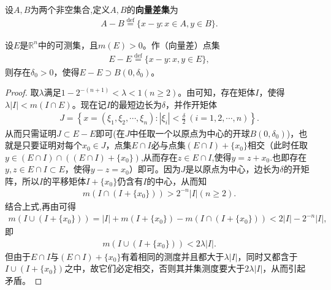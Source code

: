 \documentclass[../../main.tex]{subfiles}
\begin{document}
\begin{definition}[向量差集]\label{definition:向量差集}
设$A,B$为两个非空集合,定义$A,B$的\textbf{向量差集}为
\begin{align*}
A - B \stackrel{\text{def}}{=} \{x - y: x\in A,y \in B\}.
\end{align*}
\end{definition}

\begin{theorem}[Steinhaus定理]\label{theorem:Steinhaus定理}
设\(E\)是\(\mathbb{R}^n\)中的可测集，且\(m(E)>0\)。作（向量差）点集
\begin{align*}
E - E \stackrel{\text{def}}{=} \{x - y: x,y \in E\},
\end{align*}
则存在\(\delta_0>0\)，使得\(E - E \supset B(0,\delta_0)\)。
\end{theorem}
\begin{proof}
取\(\lambda\)满足\(1 - 2^{-(n + 1)}<\lambda<1\)$(n\geq 2)$。由可知，存在矩体\(I\)，使得\(\lambda|I|<m(I\cap E)\)。现在记\(I\)的最短边长为\(\delta\)，并作开矩体
\begin{align*}
J = \left\{x = (\xi_1,\xi_2,\cdots,\xi_n): |\xi_i|<\frac{\delta}{2}\ (i = 1,2,\cdots,n)\right\}.
\end{align*}
从而只需证明\(J\subset E - E\)即可(在$J$中任取一个以原点为中心的开球$B(0,\delta_0)$)，也就是只要证明对每个\(x_0\in J\)，点集\(E\cap I\)必与点集\((E\cap I)+\{x_0\}\)相交（此时任取$y\in (E\cap I)\cap((E\cap I)+\{x_0\})$,从而存在$z\in E\cap I$,使得$y=z+x_0$.也即存在\(y,z\in E\cap I\subset E\)，使得\(y - z = x_0\)）即可。因为\(J\)是以原点为中心，边长为\(\delta\)的开矩阵，所以\(I\)的平移矩体\(I+\{x_0\}\)仍含有\(I\)的中心，从而知
\begin{align*}
m(I\cap (I+\{x_0\}))>2^{-n}|I|(n\geq 2).
\end{align*}
结合上式,再由可得
\begin{align*}
m(I\cup (I+\{x_0\}))=|I|+m(I+\{x_0\})-m(I\cap (I+\{x_0\}))
<2|I|-2^{-n}|I|,
\end{align*}
即
\begin{align*}
m(I\cup (I+\{x_0\}))<2\lambda|I|.
\end{align*}
但由于\(E\cap I\)与\((E\cap I)+\{x_0\}\)有着相同的测度并且都大于\(\lambda|I|\)，同时又都含于\(I\cup (I+\{x_0\})\)之中，故它们必定相交，否则其并集测度要大于\(2\lambda|I|\)，从而引起矛盾。
\end{proof} 
\end{document}
